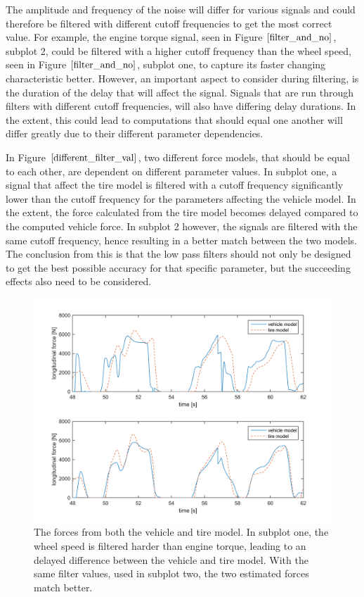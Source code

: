 The amplitude and frequency of the noise will differ for various signals and could therefore be filtered with different cutoff frequencies to get the most correct value. For example, the engine torque signal, seen in Figure $ \ref{filter_and_no} $, subplot 2, could be filtered with a higher cutoff frequency than the wheel speed, seen in Figure $ \ref{filter_and_no} $, subplot one, to capture its faster changing characteristic better. However, an important aspect to consider during filtering, is the duration of the delay that will affect the signal. Signals that are run through filters with different cutoff frequencies, will also have differing delay durations. In the extent, this could lead to computations that should equal one another will differ greatly due to their different parameter dependencies. 

In Figure $ \ref{different_filter_val} $, two different force models, that should be equal to each other, are dependent on different parameter values. In subplot one, a signal that affect the tire model is filtered with a cutoff frequency significantly lower than the cutoff frequency for the parameters affecting the vehicle model. In the extent, the force calculated from the tire model becomes delayed compared to the computed vehicle force. In subplot 2 however, the signals are filtered with the same cutoff frequency, hence resulting in a better match between the two models. The conclusion from this is that the low pass filters should not only be designed to get the best possible accuracy for that specific parameter, but the succeeding effects also need to be considered.

\begin{figure}[h]
	\centering
	\includegraphics[width=1.0\textwidth]{Pictures/different_filter_val}
	\caption {The forces from both the vehicle and tire model. In subplot one, the wheel speed is filtered harder than engine torque, leading to an delayed difference between the vehicle and tire model. With the same filter values, used in subplot two, the two estimated forces match better.}
	\label{different_filter_val}
\end{figure}

